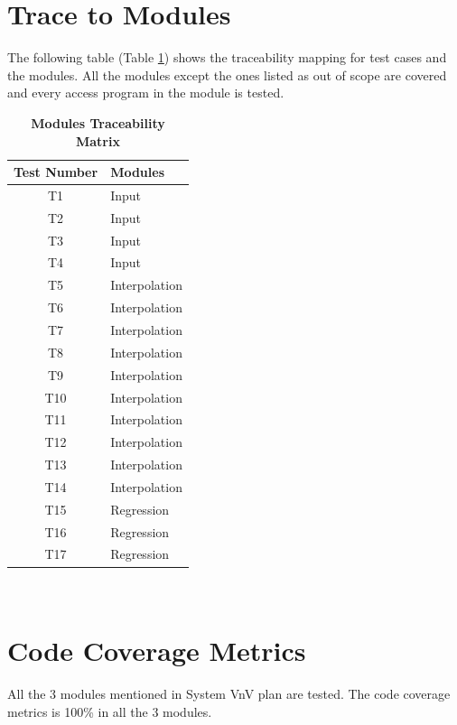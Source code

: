 \documentclass[12pt, titlepage]{article}
\begin{document}
		
\section{Trace to Modules}	

The following table (Table \ref{Table:Table_TraceabilityM}) shows the 
traceability mapping for test cases and the 
modules. All the modules except the ones listed as out of scope are 
covered and 
every access program in the module is tested. 

\begin{table}
	\caption{\textbf{Modules Traceability Matrix}}
	\label{Table:Table_TraceabilityM}  
	\begin{tabular}{|c|p{5cm}|}
		\hline	
		\textbf{Test Number} & \textbf{Modules} \\
		\hline 
		T1&  Input      \\ \hline
		T2&  Input      \\ \hline
		T3&  Input     \\ \hline
		T4&  Input     \\ \hline
		T5&  Interpolation      \\ \hline
		T6&  Interpolation     \\ \hline
		T7&  Interpolation     \\ \hline
		T8&  Interpolation      \\ \hline
		T9&  Interpolation     \\ \hline
		T10& Interpolation      \\ \hline
		T11& Interpolation      \\ \hline
		T12& Interpolation     \\ \hline
		T13& Interpolation     \\ \hline
		T14& Interpolation      \\ \hline
		T15& Regression     \\ \hline
		T16& Regression     \\ \hline
		T17& Regression      \\ \hline
		
	\end{tabular}\\
\end{table}


	

\section{Code Coverage Metrics} 

All the 3 modules mentioned in System VnV plan are tested. The code 
coverage 
metrics is 100\% in all the 3 modules. 

%

%
\end{document}
